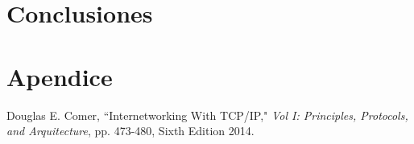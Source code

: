 \documentclass[10pt, a4paper,notitlepage]{article}
\begin{document}
\section{Conclusiones}

\section{Apendice}

\begin{thebibliography}{100} %
 Douglas E. Comer, ``Internetworking With TCP/IP," \emph{Vol I: Principles, Protocols, and Arquitecture}, pp. 473-480, Sixth Edition 2014.
\end{thebibliography}
\end{document}
